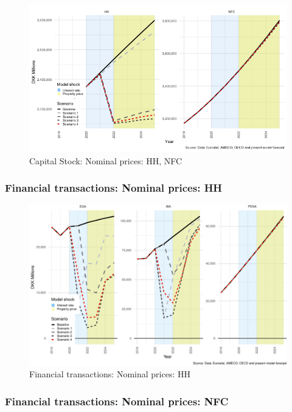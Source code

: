 \documentclass[
]{book}
\begin{document}
\begin{figure}[H]
\includegraphics[width=0.95\linewidth]{figures/fl-fi-sfc-plot-k-1} \caption{Capital Stock: Nominal prices: HH, NFC}\label{fig:fl-fi-sfc-plot-k}
\end{figure}

\hypertarget{financial-transactions-nominal-prices-hh}{%
\subsubsection{Financial transactions: Nominal prices: HH}\label{financial-transactions-nominal-prices-hh}}

\begin{figure}
\centering
\includegraphics{figures/fl-fi-sfc-plot-fin-tr-HH-1.pdf}
\caption{\label{fig:fl-fi-sfc-plot-fin-tr-HH}Financial transactions: Nominal prices: HH}
\end{figure}

\hypertarget{financial-transactions-nominal-prices-nfc}{%
\subsubsection{Financial transactions: Nominal prices: NFC}\label{financial-transactions-nominal-prices-nfc}}
\end{document}
